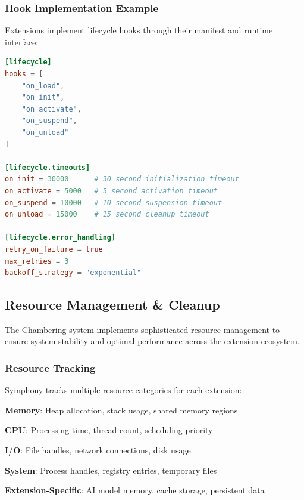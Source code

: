\subsubsection{Hook Implementation Example}
\label{subsubsec:hook-implementation-example}

Extensions implement lifecycle hooks through their manifest and runtime interface:

\begin{lstlisting}[language=toml,caption=Lifecycle Hook Configuration in Symphony.toml]
[lifecycle]
hooks = [
    "on_load",
    "on_init", 
    "on_activate",
    "on_suspend",
    "on_unload"
]

[lifecycle.timeouts]
on_init = 30000      # 30 second initialization timeout
on_activate = 5000   # 5 second activation timeout
on_suspend = 10000   # 10 second suspension timeout
on_unload = 15000    # 15 second cleanup timeout

[lifecycle.error_handling]
retry_on_failure = true
max_retries = 3
backoff_strategy = "exponential"
\end{lstlisting}

\subsection{Resource Management \& Cleanup}
\label{subsec:resource-management-cleanup}

The Chambering system implements sophisticated resource management to ensure system stability and optimal performance across the extension ecosystem.

\subsubsection{Resource Tracking}
\label{subsubsec:resource-tracking}

Symphony tracks multiple resource categories for each extension:

\begin{compactlist}
\item \textbf{Memory}: Heap allocation, stack usage, shared memory regions
\item \textbf{CPU}: Processing time, thread count, scheduling priority
\item \textbf{I/O}: File handles, network connections, disk usage
\item \textbf{System}: Process handles, registry entries, temporary files
\item \textbf{Extension-Specific}: AI model memory, cache storage, persistent data
\end{compactlist}


